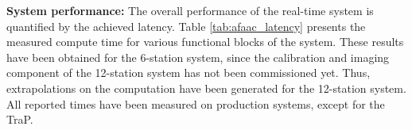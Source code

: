 \documentclass{ws-jai}
\begin{document}




\noindent \textbf {System performance:} The overall performance of the real-time
system  is quantified  by  the achieved  latency. Table  \ref{tab:afaac_latency}
presents  the  measured  compute  time  for various  functional  blocks  of  the
system. These  results have been  obtained for  the 6-station system,  since the
calibration  and  imaging  component  of  the 12-station  system  has  not  been
commissioned yet.  Thus, extrapolations on  the computation have  been generated
for the 12-station  system. All reported times have been  measured on production
systems, except for the TraP.
\end{document}
